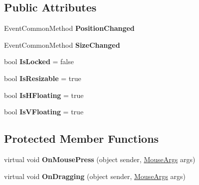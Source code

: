 \subsection*{Public Attributes}
\begin{DoxyCompactItemize}
\item 
\mbox{\label{class_space_v_i_l_1_1_resizable_item_a52ef99bd7bba1fbccf848baecb0f3872}} 
Event\+Common\+Method {\bfseries Position\+Changed}
\item 
\mbox{\label{class_space_v_i_l_1_1_resizable_item_a501b6c0a31911ceb931aa11928b86a40}} 
Event\+Common\+Method {\bfseries Size\+Changed}
\item 
\mbox{\label{class_space_v_i_l_1_1_resizable_item_a6ef36f901dca5d79d28ebd21ca0ec6e1}} 
bool {\bfseries Is\+Locked} = false
\item 
\mbox{\label{class_space_v_i_l_1_1_resizable_item_a418b3190b96cc1646c0f600fc28f996c}} 
bool {\bfseries Is\+Resizable} = true
\item 
\mbox{\label{class_space_v_i_l_1_1_resizable_item_a6426931b5af7767ac81cb527e94727b8}} 
bool {\bfseries Is\+H\+Floating} = true
\item 
\mbox{\label{class_space_v_i_l_1_1_resizable_item_a9ff352bf26517b2e601f0cd43bf2dc9b}} 
bool {\bfseries Is\+V\+Floating} = true
\end{DoxyCompactItemize}
\subsection*{Protected Member Functions}
\begin{DoxyCompactItemize}
\item 
\mbox{\label{class_space_v_i_l_1_1_resizable_item_aef4b35258bca233e8dd0d9619f04395e}} 
virtual void {\bfseries On\+Mouse\+Press} (object sender, \mbox{\hyperlink{class_space_v_i_l_1_1_core_1_1_mouse_args}{Mouse\+Args}} args)
\item 
\mbox{\label{class_space_v_i_l_1_1_resizable_item_af2a4d51cfdb342756850573fdaf052c0}} 
virtual void {\bfseries On\+Dragging} (object sender, \mbox{\hyperlink{class_space_v_i_l_1_1_core_1_1_mouse_args}{Mouse\+Args}} args)
\end{DoxyCompactItemize}


